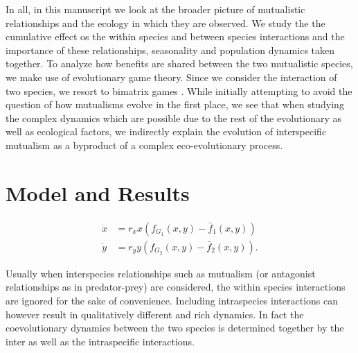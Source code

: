 \documentclass{pnastwo}
\begin{document}
\begin{article}
In all, in this manuscript we look at the broader picture of mutualistic relationships and the ecology in which they are observed.
We study the the cumulative effect os the within species and between species interactions and the importance of these relationships, seasonality and population dynamics taken together.
To analyze how benefits are shared between the two mutualistic species, we make use of evolutionary game theory.
Since we consider the interaction of two species, we resort to bimatrix games
\cite{weibull:book:1995,hofbauer:JMB:1996,hofbauer:book:1998}.
While initially attempting to avoid the question of how mutualisms evolve in the first place, we see that when studying the complex dynamics which are possible due to the rest of the evolutionary as well as ecological factors, we indirectly explain the evolution of interspecific mutualism as a byproduct of a complex eco-evolutionary process.



\section{Model and Results}


\begin{align}
\dot{x} &= r_x x \left(f_{G_1}(x,y) -  \bar{f}_1(x,y) \right) \nonumber \\
\dot{y} &= r_y y \left(f_{G_2}(x,y) -  \bar{f}_2(x,y) \right).
\label{eq:repeqs}
\end{align}

Usually when interspecies relationships such as mutualism (or antagonist relationships as in predator-prey) are considered, the within species interactions are ignored for the sake of convenience. Including intraspecies interactions can however result in qualitatively different and rich dynamics.
In fact the coevolutionary dynamics between the two species is determined together by the inter as well as the intraspecific interactions.



\end{article}
\end{document}
